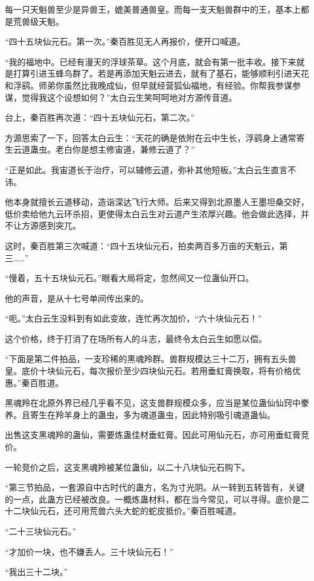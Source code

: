 \begin{this_body}
每一只天魁兽至少是异兽王，媲美普通兽皇。而每一支天魁兽群中的王，基本上都是荒兽级天魁。

“四十五块仙元石。第一次。”秦百胜见无人再报价，便开口喊道。

“我的福地中。已经有漫天的浮球茶草。这个月底，就会有第一批丰收。接下来就是打算引进玉蜂鸟群了。若是再添加天魁云进去，就有了基石，能够顺利引进天花和浮鹞。师弟你虽然比我晚成仙，但早就经营狐仙福地，有经验。你帮我参谋参谋，觉得我这个设想如何？”太白云生笑呵呵地对方源传音道。

台上，秦百胜再次道：“四十五块仙元石，第二次。”

方源思索了一下，回答太白云生：“天花的确是依附在云中生长，浮鹞身上通常寄生云道蛊虫。老白你是想主修宙道，兼修云道了？”

“正是如此。我宙道长于治疗，可以辅修云道，弥补其他短板。”太白云生直言不讳。

他本身就擅长云道移动，造诣深达飞行大师。后来又得到北原墨人王墨坦桑交好，低价卖给他九云环杀招，更使得太白云生对云道产生浓厚兴趣。他会做此选择，并不让方源感到突兀。

这时，秦百胜第三次喊道：“四十五块仙元石，拍卖两百多万亩的天魁云，第三……”

“慢着，五十五块仙元石。”眼看大局将定，忽然间又一位蛊仙开口。

他的声音，是从十七号单间传出来的。

“呃。”太白云生没料到有如此变故，连忙再次加价，“六十块仙元石！”

这个价格，终于打消了在场所有人的斗志，最终令太白云生如愿以偿。

“下面是第二件拍品，一支珍稀的黑魂羚群。兽群规模达三十二万，拥有五头兽皇。底价十块仙元石，每次报价至少四块仙元石。若用垂虹膏换取，将有价格优惠。”秦百胜道。

黑魂羚在北原外界已经几乎看不见，这支兽群规模众多，应当是某位蛊仙仙窍中豢养。且寄生在羚羊身上的蛊虫，多为魂道蛊虫，因此特别吸引魂道蛊仙。

出售这支黑魂羚的蛊仙，需要炼蛊佳材垂虹膏。因此可用仙元石，亦可用垂虹膏竞价。

一轮竞价之后，这支黑魂羚被某位蛊仙，以二十八块仙元石购下。

“第三节拍品，一套源自中古时代的蛊方，名为寸光阴。从一转到五转皆有，关键的一点，此蛊方已经被改良。一概炼蛊材料，都在当今常见，可以寻得。底价是二十二块仙元石，还可用荒兽六头大蛇的蛇皮抵价。”秦百胜喊道。

“二十三块仙元石。”

“才加价一块，也不嫌丢人。三十块仙元石！”

“我出三十二块。”


\end{this_body}
